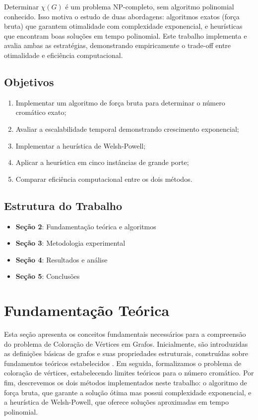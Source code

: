 \documentclass[12pt]{article}
\begin{document}
Determinar $\chi(G)$ é um problema NP-completo, sem algoritmo polinomial conhecido. Isso motiva o estudo de duas abordagens: algoritmos exatos (força bruta) que garantem otimalidade com complexidade exponencial, e heurísticas que encontram boas soluções em tempo polinomial. Este trabalho implementa e avalia ambas as estratégias, demonstrando empiricamente o trade-off entre otimalidade e eficiência computacional.

\subsection{Objetivos}

\begin{enumerate}
    \item Implementar um algoritmo de força bruta para determinar o número cromático exato;
    \item Avaliar a escalabilidade temporal demonstrando crescimento exponencial;
    \item Implementar a heurística de Welsh-Powell;
    \item Aplicar a heurística em cinco instâncias de grande porte;
    \item Comparar eficiência computacional entre os dois métodos.
\end{enumerate}

\subsection{Estrutura do Trabalho}

\begin{itemize}
    \item \textbf{Seção 2}: Fundamentação teórica e algoritmos
    \item \textbf{Seção 3}: Metodologia experimental
    \item \textbf{Seção 4}: Resultados e análise
    \item \textbf{Seção 5}: Conclusões
\end{itemize}

\newpage
\section{Fundamentação Teórica}

Esta seção apresenta os conceitos fundamentais necessários para a compreensão do problema de Coloração de Vértices em Grafos. Inicialmente, são introduzidas as definições básicas de grafos e suas propriedades estruturais, construídas sobre fundamentos teóricos estabelecidos \cite{hierholzer1873}. Em seguida, formalizamos o problema de coloração de vértices, estabelecendo limites teóricos para o número cromático. Por fim, descrevemos os dois métodos implementados neste trabalho: o algoritmo de força bruta, que garante a solução ótima mas possui complexidade exponencial, e a heurística de Welsh-Powell, que oferece soluções aproximadas em tempo polinomial.
\end{document}
